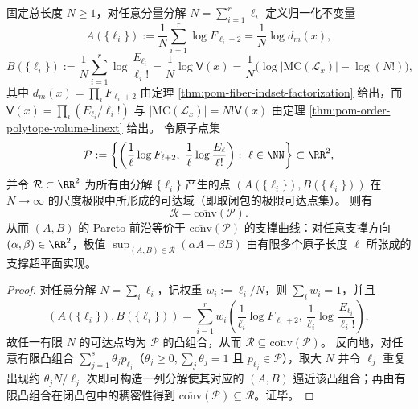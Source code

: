 \begin{theorem}\label{thm:pom-fiber-ab-convex-hull}
固定总长度 \(N\ge 1\)，对任意分量分解 \(N=\sum_{i=1}^r \ell_i\) 定义归一化不变量
\[
A(\{\ell_i\})
:=\frac{1}{N}\sum_{i=1}^r \log F_{\ell_i+2}
=\frac{1}{N}\log d_m(x),
\]
\[
B(\{\ell_i\})
:=\frac{1}{N}\sum_{i=1}^r \log\frac{E_{\ell_i}}{\ell_i!}
=\frac{1}{N}\log \mathsf V(x)
=\frac{1}{N}\bigl(\log|\mathrm{MC}(\mathcal L_x)|-\log(N!)\bigr),
\]
其中 \(d_m(x)=\prod_i F_{\ell_i+2}\) 由定理 \ref{thm:pom-fiber-indset-factorization} 给出，而 \(\mathsf V(x)=\prod_i (E_{\ell_i}/\ell_i!)\) 与 \(|\mathrm{MC}(\mathcal L_x)|=N!\mathsf V(x)\) 由定理 \ref{thm:pom-order-polytope-volume-linext} 给出。
令原子点集
\[
\mathcal P
:=
\left\{
\left(\frac{1}{\ell}\log F_{\ell+2},\ \frac{1}{\ell}\log\frac{E_\ell}{\ell!}\right):\ \ell\in\NN
\right\}
\subset\RR^2,
\]
并令 \(\mathcal R\subset\RR^2\) 为所有由分解 \(\{\ell_i\}\) 产生的点 \((A(\{\ell_i\}),B(\{\ell_i\}))\) 在 \(N\to\infty\) 的尺度极限中所形成的可达域（即取闭包的极限可达点集）。
则有
\[
\mathcal R=\overline{\mathrm{conv}}(\mathcal P).
\]
从而 \((A,B)\) 的 Pareto 前沿等价于 \(\overline{\mathrm{conv}}(\mathcal P)\) 的支撑曲线：对任意支撑方向 \((\alpha,\beta)\in\RR^2\)，极值 \(\sup_{(A,B)\in\mathcal R}(\alpha A+\beta B)\) 由有限多个原子长度 \(\ell\) 所张成的支撑超平面实现。
\end{theorem}
\begin{proof}
对任意分解 \(N=\sum_i \ell_i\)，记权重 \(w_i:=\ell_i/N\)，则 \(\sum_i w_i=1\)，并且
\[
(A(\{\ell_i\}),B(\{\ell_i\}))
=\sum_{i=1}^r w_i\left(\frac{1}{\ell_i}\log F_{\ell_i+2},\ \frac{1}{\ell_i}\log\frac{E_{\ell_i}}{\ell_i!}\right),
\]
故任一有限 \(N\) 的可达点均为 \(\mathcal P\) 的凸组合，从而 \(\mathcal R\subseteq \overline{\mathrm{conv}}(\mathcal P)\)。
反向地，对任意有限凸组合 \(\sum_{j=1}^s \theta_j p_{\ell_j}\)（\(\theta_j\ge 0,\sum_j\theta_j=1\) 且 \(p_{\ell_j}\in\mathcal P\)），取大 \(N\) 并令 \(\ell_j\) 重复出现约 \(\theta_j N/\ell_j\) 次即可构造一列分解使其对应的 \((A,B)\) 逼近该凸组合；再由有限凸组合在闭凸包中的稠密性得到 \(\overline{\mathrm{conv}}(\mathcal P)\subseteq \mathcal R\)。证毕。
\end{proof}



